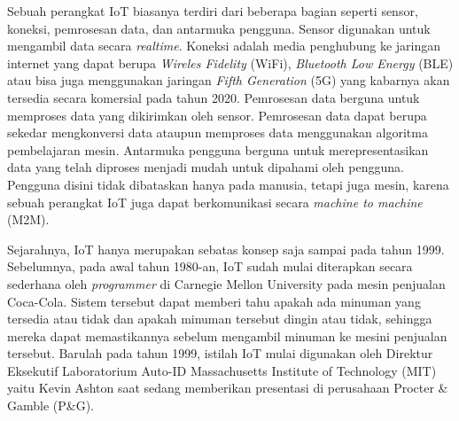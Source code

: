 \documentclass[12pt, letterpaper]{article}
\begin{document}
\setlength{\parindent}{4ex}
Sebuah perangkat IoT biasanya terdiri dari beberapa bagian seperti sensor, koneksi, pemrosesan data, dan antarmuka pengguna.\cite{dflair18} Sensor digunakan untuk mengambil data secara \textit{realtime}. Koneksi adalah media penghubung ke jaringan internet yang dapat berupa \textit{Wireles Fidelity} (WiFi), \textit{Bluetooth Low Energy} (BLE) atau bisa juga menggunakan jaringan \textit{Fifth Generation} (5G) yang kabarnya akan tersedia secara komersial pada tahun 2020.\cite{erricson17} Pemrosesan data berguna untuk memproses data yang
dikirimkan oleh sensor. Pemrosesan data dapat berupa sekedar mengkonversi data ataupun memproses data menggunakan algoritma pembelajaran mesin. Antarmuka pengguna berguna untuk merepresentasikan data yang telah diproses menjadi mudah untuk dipahami oleh pengguna. Pengguna disini tidak dibataskan hanya pada manusia, tetapi juga mesin, karena sebuah perangkat IoT juga dapat berkomunikasi secara \textit{machine to machine} (M2M).

\setlength{\parindent}{4ex}
Sejarahnya, IoT hanya merupakan sebatas konsep saja sampai pada tahun 1999.\cite{dversity16} Sebelumnya, pada awal tahun 1980-an, IoT sudah mulai diterapkan secara sederhana oleh \textit{programmer} di Carnegie Mellon University pada mesin penjualan Coca-Cola. Sistem tersebut dapat memberi tahu apakah ada minuman yang tersedia atau tidak dan apakah minuman tersebut dingin atau tidak, sehingga mereka dapat memastikannya sebelum mengambil minuman ke mesini penjualan tersebut. Barulah pada tahun 1999, istilah IoT mulai digunakan
oleh Direktur Eksekutif Laboratorium Auto-ID Massachusetts Institute of Technology (MIT) yaitu Kevin Ashton saat sedang memberikan presentasi di perusahaan Procter \& Gamble (P\&G).

\newpage
\printbibliography[title=Daftar Pustaka]
\end{document}
